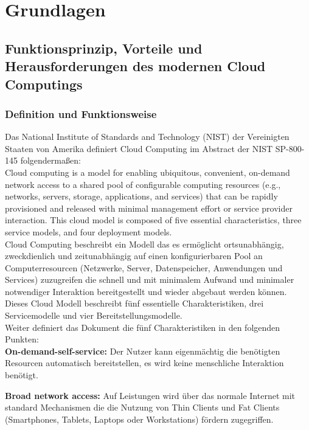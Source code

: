 
\chapter{Grundlagen}
\label{sec:grundl}

\section{Funktionsprinzip, Vorteile und Herausforderungen des modernen Cloud Computings}

\subsection{Definition und Funktionsweise}

Das National Institute of Standards and Technology (NIST) der Vereinigten
Staaten von Amerika definiert Cloud Computing im Abstract der NIST SP-800-145
folgendermaßen:\\

Cloud computing is a model for enabling ubiquitous, convenient, on-demand network access to a shared
pool of configurable computing resources (e.g., networks, servers, storage, applications, and services) that
can be rapidly provisioned and released with minimal management effort or service provider interaction.
This cloud model is composed of five essential characteristics, three service models, and four deployment
models.\\

Cloud Computing beschreibt ein Modell das es ermöglicht ortsunabhängig, zweckdienlich und
zeitunabhängig auf einen konfigurierbaren Pool an Computerresourcen (Netzwerke, Server,
Datenspeicher, Anwendungen und Services) zuzugreifen die schnell und mit minimalem
Aufwand und minimaler notwendiger Interaktion bereitgestellt und wieder abgebaut
werden können.
Dieses Cloud Modell beschreibt fünf essentielle Charakteristiken, drei Servicemodelle
und vier Bereitstellungsmodelle.\\

Weiter definiert das Dokument die fünf Charakteristiken in den folgenden Punkten:\\

\textbf{On-demand-self-service:} Der Nutzer kann eigenmächtig die benötigten Resourcen
automatisch bereitstellen, es wird keine menschliche Interaktion benötigt.

\textbf{Broad network access:} Auf Leistungen wird über das normale Internet mit standard
Mechanismen die die Nutzung von Thin Clients und Fat Clients (Smartphones, Tablets,
Laptops oder Workstations) fördern zugegriffen.
 

